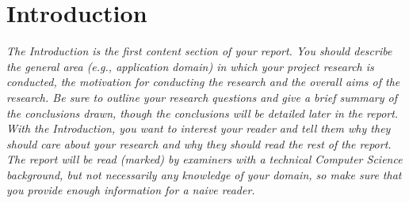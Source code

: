 \section{Introduction}

\emph{The Introduction is the first content section of your report. You should describe the general area (e.g., application domain) in which your project research is conducted, the motivation for conducting the research and the overall aims of the research. Be sure to outline your research questions and give a brief summary of the conclusions drawn, though the conclusions will be detailed later in the report. With the Introduction, you want to interest your reader and tell them why they should care about your research and why they should read the rest of the report. The report will be read (marked) by examiners with a technical Computer Science background, but not necessarily any knowledge of your domain, so make sure that you provide enough information for a naive reader.}
